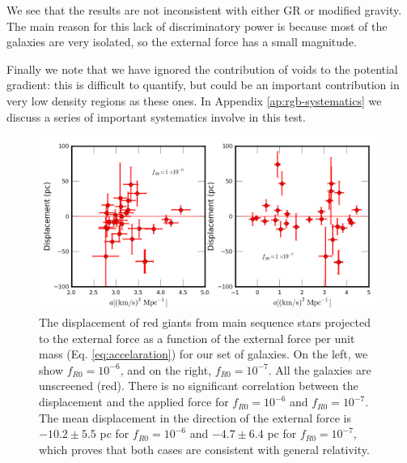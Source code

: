\documentclass[useAMS,usenatbib,twocolumn]{mn2e}
\begin{document}
We see that the results are not inconsistent with either GR or modified
gravity.  The main reason for this lack of
discriminatory power is because most of the galaxies are very isolated,
so the external force has a small magnitude.

Finally we note that we have ignored the contribution
of voids to the potential gradient: this is difficult to quantify, but could
be an important contribution in very low density regions as these ones. In
Appendix \ref{ap:rgb-systematics} we discuss a series of important systematics
involve in this test.

\begin{figure}
\includegraphics[scale=0.5]{figures/dispprojforce.png}
  \caption{The displacement of red giants from main sequence stars projected to
the external force as a function of the external force per unit mass
(Eq. \ref{eq:accelaration}) for our
set of galaxies.
On the left, we show $f_{R0}=10^{-6}$, and on the right, $f_{R0}=10^{-7}$. All
the galaxies are unscreened (red). There is no significant correlation between
the
displacement and the applied force for $f_{R0}=10^{-6}$ and $f_{R0}=10^{-7}$.
 The mean displacement in the direction of the 
external force is $-10.2\pm5.5$ pc for $f_{R0}=10^{-6}$ and $-4.7\pm6.4$ pc for
$f_{R0}=10^{-7}$, which proves that both cases are consistent with general
relativity.
\label{fig:rgdispprojforce}}

\end{figure}

\end{document}

